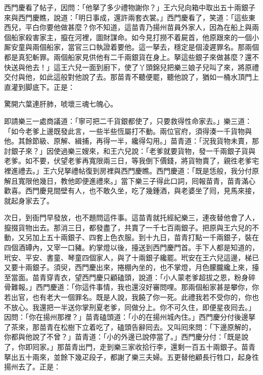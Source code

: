 西門慶看了帖子，因問：「他拏了多少禮物謝你？」王六兒向箱中取出五十兩銀子來與西門慶瞧，說道：「明日事成，還許兩套衣裳。」西門慶看了，笑道：「這些東西兒，平白你要他做甚麼？你不知道，這苗青乃揚州苗員外家人，因為在船上與兩個船家殺害家主，攛在河裡，圖財謀命。如今見打撈不着屍首，他原跟來的一個小厮安童與兩個船家，當官三口執證着要他。這一拏去，穩定是個淩遲罪名。那兩個都是真犯斬罪。兩個船家見供他有二千兩銀貨在身上。拏這些銀子來做甚麼？還不快送與他去！」這王六兒一面到廚下，使了丫頭錦兒把樂三娘子兒叫了來，將原禮交付與他，如此這般對他說了去。那苗青不聽便罷，聽他說了，猶如一桶水頂門上直灌到脚底下。正是：

\begin{myquote}
驚開六葉連肝肺，唬壞三魂七魄心。
\end{myquote}

即請樂三一處商議道：「寧可把二千貨銀都使了，只要救得性命家去。」樂三道：「如今老爹上邊既發此言，一些半些恆屬打不動。兩位官府，須得湊一千貨物與他。其餘節級、原解、緝捕，再得一半，纔得勾用。」苗青道：「況我貨物未賣，那討銀子來？」因使過樂三嫂來，和王六兒說：「老爹就要貨物，發一千兩銀子貨與老爹。如不要，伏望老爹再寬限兩三日，等我倒下價錢，將貨物賣了，親徃老爹宅裡進禮去。」王六兒拏禮帖復到房裡與西門慶瞧。西門慶道：「既是恁般，我分付原解且寬限他幾日，教他即便進禮來。」當下樂三子得此口詞，囘報苗青，苗青滿心歡喜。西門慶見間壁有人，也不敢久坐，吃了幾鍾酒，與老婆坐了囘，見馬來接，就起身家去了。

次日，到衙門早發放，也不題問這件事。這苗青就托經紀樂三，連夜替他會了人，攛掇貨物出去。那消三日，都發盡了，共賣了一千七百兩銀子。把原與王六兒的不動，又另加上五十兩銀子、四套上色衣服。到十九日，苗青打點一千兩銀子，裝在四個酒罈內，又宰一口豬。約掌燈以後，擡送到西門慶門首。手下人都是知道的，玳安、平安、書童、琴童四個家人，與了十兩銀子纔罷。玳安在王六兒這邊，梯已又要十兩銀子。須臾，西門慶出來，捲棚內坐的，也不掌燈，月色朦朧纔上來，{}擡至當面。苗青穿青衣，望西門慶只顧磕頭，說道：「小人蒙老爹超拔之恩，粉身碎骨難報。」西門慶道：「你這件事情，我也還沒好審問哩。那兩個船家甚是攀你，你若出官，也有老大一個罪名。既是人說，我饒了你一死。此禮我若不受你的，你也不放心。我還把一半送你掌刑夏老爹，同做分上。你不可久住，即便星夜囘去。」因問：「你在揚州那裡？」苗青磕頭道：「小的在揚州城內住。」西門慶分付後邊拏了茶來，那苗青在松樹下立着吃了，磕頭告辭囘去。又叫囘來問：「下邊原解的，你都與他說了不曾？」苗青道：「小的外邊已說停當了。」西門慶分付：「既是說了，你即囘家。」那苗青出門，走到樂三家收拾行李，還剩一百五十兩銀子。苗青拏出五十兩來，並餘下幾疋段子，都謝了樂三夫婦。五更替他顧長行牲口，起身徃揚州去了。正是：

